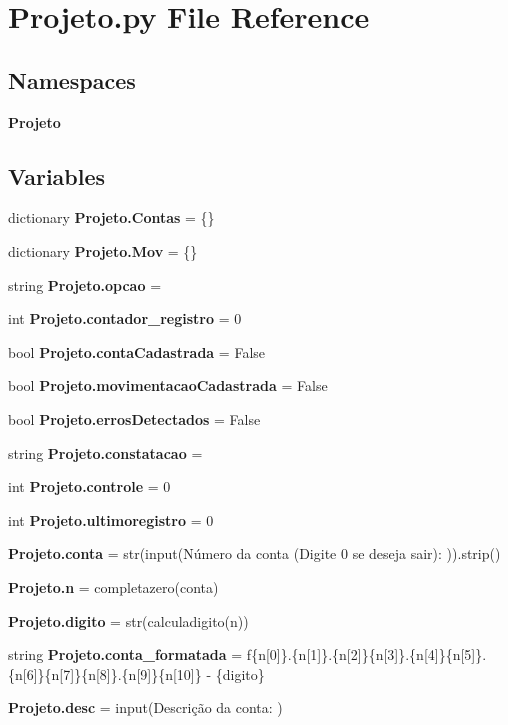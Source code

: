 \section{Projeto.\+py File Reference}
\label{_projeto_8py}
\subsection*{Namespaces}
\begin{DoxyCompactItemize}
\item 
 \textbf{ Projeto}
\end{DoxyCompactItemize}
\subsection*{Variables}
\begin{DoxyCompactItemize}
\item 
dictionary \textbf{ Projeto.\+Contas} = \{\}
\item 
dictionary \textbf{ Projeto.\+Mov} = \{\}
\item 
string \textbf{ Projeto.\+opcao} = \textquotesingle{}\textquotesingle{}
\item 
int \textbf{ Projeto.\+contador\+\_\+registro} = 0
\item 
bool \textbf{ Projeto.\+conta\+Cadastrada} = False
\item 
bool \textbf{ Projeto.\+movimentacao\+Cadastrada} = False
\item 
bool \textbf{ Projeto.\+erros\+Detectados} = False
\item 
string \textbf{ Projeto.\+constatacao} = \textquotesingle{}\textquotesingle{}
\item 
int \textbf{ Projeto.\+controle} = 0
\item 
int \textbf{ Projeto.\+ultimoregistro} = 0
\item 
\textbf{ Projeto.\+conta} = str(input(\textquotesingle{}Número da conta (Digite 0 se deseja sair)\+: \textquotesingle{})).strip()
\item 
\textbf{ Projeto.\+n} = completazero(conta)
\item 
\textbf{ Projeto.\+digito} = str(calculadigito(n))
\item 
string \textbf{ Projeto.\+conta\+\_\+formatada} = f\textquotesingle{}\{n[0]\}.\{n[1]\}.\{n[2]\}\{n[3]\}.\{n[4]\}\{n[5]\}.\{n[6]\}\{n[7]\}\{n[8]\}.\{n[9]\}\{n[10]\} -\/ \{digito\}\textquotesingle{}
\item 
\textbf{ Projeto.\+desc} = input(\textquotesingle{}Descrição da conta\+: \textquotesingle{})

\end{DoxyCompactItemize}
